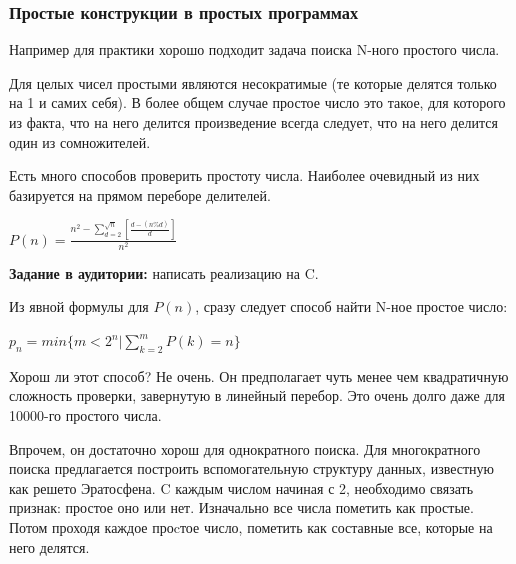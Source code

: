 \documentclass[a4paper,12pt,oneside]{article}
\newif\ifanswers
\begin{document}
\subsubsection{Простые конструкции в простых программах}

Например для практики хорошо подходит задача поиска N-ного простого числа.

Для целых чисел простыми являются несократимые (те которые делятся только на 1 и самих себя). В более общем случае простое число это такое, для которого из факта, что на него делится произведение всегда следует, что на него делится один из сомножителей.

Есть много способов проверить простоту числа. Наиболее очевидный из них базируется на прямом переборе делителей. 

$P(n)=\frac{n^2-\sum\limits_{d=2}^{\sqrt{n}} [\frac{d-(n\%d)}{d}]}{n^2}$

\textbf{Задание в аудитории:} написать реализацию на C.

\ifanswers
Возможный ответ:

\begin{lstlisting}
int
is_prime(unsigned long long nxt)
{
  unsigned r, f;

  if (nxt == 1) return 0;
  if (nxt < 4) return 1;
  if ((nxt % 2) == 0) return 0;
  if (nxt < 9) return 1;
  if ((nxt % 3) == 0) return 0;
  
  r = (unsigned) sqrt ((double)nxt);
  f = 5;

  while (f <= r)
    {
      if ((nxt % f) == 0) return 0;
      if ((nxt % (f + 2)) == 0) return 0;
      f += 6;
    }

  return 1;
}
\end{lstlisting}
\fi

Из явной формулы для $P(n)$, сразу следует способ найти N-ное простое число:

$p_n=min\{m<2^n|\sum\limits_{k=2}^{m}P(k)=n\}$

Хорош ли этот способ? Не очень. Он предполагает чуть менее чем квадратичную сложность проверки, завернутую в линейный перебор. Это очень долго даже для 10000-го простого числа.

Впрочем, он достаточно хорош для однократного поиска. Для многократного поиска предлагается построить вспомогательную структуру данных, известную как решето Эратосфена. C каждым числом начиная с 2, необходимо связать признак: простое оно или нет. Изначально все числа пометить как простые. Потом проходя каждое проcтое число, пометить как составные все, которые на него делятся.
\end{document}
